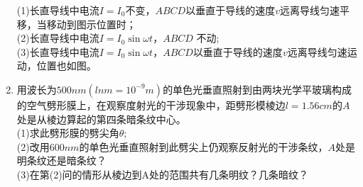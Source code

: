 \begin{enumerate}
(1)长直导线中电流$I=I_0$不变，$ABCD $以垂直于导线的速度$v$远离导线匀速平移，当移动到图示位置时；\\
(2)长直导线中电流$I=I_0\sin \omega t$，$ABCD$ 不动;\\
(3)长直导线中电流$I=I_0\sin \omega t$，$ABCD$以垂直于导线的速度$v$远离导线匀速运动，位置也如图。
\item 用波长为$ 500nm(lnm=10^{-9}m)$的单色光垂直照射到由两块光学平玻璃构成的空气劈形膜上，在观察度射光的干涉现象中，距劈形模棱边$l=1.56cm$的$A$处是从棱边算起的第四条暗条纹中心。\\
(1)求此劈形膜的劈尖角$\theta$;\\
(2)改用$600nm$的单色光垂直照射到此劈尖上仍观察反射光的干涉条纹，$A$处是明条纹还是暗条纹？\\(3)在第(2)问的情形从棱边到A处的范围共有几条明纹？几条暗纹？
\end{enumerate}